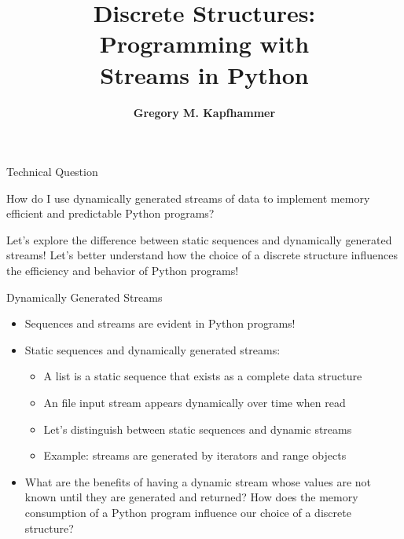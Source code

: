 \documentclass[14pt,aspectratio=169]{beamer}
\title{Discrete Structures: \\ Programming with \\ Streams in Python}
\author{{\bf Gregory M. Kapfhammer}}
\institute[shortinst]{{\bf Department of Computer Science, Allegheny College}}
\begin{document}
{
  \begin{frame}
    \titlepage
  \end{frame}
}

%
\begin{frame}{Technical Question}
  \hspace*{.25in}
  \begin{minipage}{4.8in}
    \vspace*{.1in}
    \begin{center}
      {\large How do I use dynamically generated streams of data to implement
      memory efficient and predictable Python programs?}
    \end{center}
  \end{minipage}
  \vspace{2ex}
  \begin{center}
    \small Let's explore the difference between static sequences and dynamically
    generated streams! Let's better understand how the choice of a discrete
    structure influences the efficiency and behavior of Python programs!
  \end{center}
\end{frame}

%
\begin{frame}{Dynamically Generated Streams}
  \begin{itemize}
    \item Sequences and streams are evident in Python programs!
      \vspace*{-.15in}
    \item Static sequences and dynamically generated streams:
      \begin{itemize}
        \item A list is a static sequence that exists as a complete data
          structure
        \item An file input stream appears dynamically over time when read
        \item Let's distinguish between static sequences and dynamic streams
        \item Example: streams are generated by iterators and range objects
      \end{itemize}
      \vspace*{-.2in}
    \item What are the benefits of having a dynamic stream whose values are not
      known until they are generated and returned? How does the memory
      consumption of a Python program influence our choice of a discrete
      structure?
  \end{itemize}
\end{frame}
\end{document}
